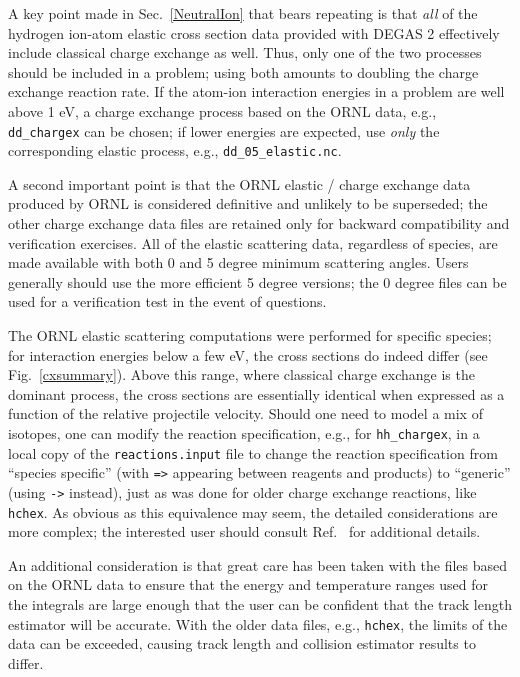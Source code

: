 \documentclass[12pt]{report}
\begin{document}
A key point made in Sec.~\ref{NeutralIon} that bears repeating is that
{\em all} of the hydrogen ion-atom elastic cross section data provided with DEGAS 2
effectively include classical charge exchange as well.  Thus, only one
of the two processes should be included in a problem; using both 
amounts to doubling the charge exchange reaction rate.  If the 
atom-ion interaction energies in a problem are 
well above 1 eV, a charge exchange process
based on the ORNL data, e.g., {\tt dd\_chargex}
can be chosen; if lower energies are expected, use {\em only}
the corresponding elastic process, e.g., {\tt dd\_05\_elastic.nc}.

A second important point is that the ORNL elastic / charge exchange
data produced by ORNL\cite{Krst98} is considered definitive
and unlikely to be superseded; the other charge exchange data
files are retained only for backward compatibility and verification
exercises.  All of the elastic scattering data, regardless of species,
are made available with both 0 and 5 degree minimum scattering angles.
Users generally should use the more efficient 5 degree versions; the
0 degree files can be used for a verification test in the event
of questions.

The ORNL elastic scattering computations were performed for
specific species; for interaction energies below a few eV, the cross 
sections do indeed differ (see Fig.~\ref{cxsummary}).  Above this
range, where classical charge exchange is the dominant process,
the cross sections are essentially identical when expressed
as a function of the relative projectile velocity.  Should one
need to model a mix of isotopes, one can modify the reaction 
specification, e.g., for {\tt hh\_chargex}, in a local copy 
of the {\tt reactions.input} file to change the reaction
specification from ``species specific'' (with \verb+=>+ 
appearing between reagents and products) to ``generic''
(using \verb+->+ instead), just as was done for older 
charge exchange reactions, like {\tt hchex}.  As obvious
as this equivalence may seem, the detailed considerations
are more complex; the interested user should consult
Ref.~\cite{Krst99} for additional details.

An additional consideration is that great care has been taken with
the files based on the ORNL data to ensure that the energy and
temperature ranges used for the integrals are large enough that
the user can be confident that the track length estimator 
will be accurate.  With the older data files, e.g., {\tt hchex}, 
the limits of the data can be exceeded, causing track length
and collision estimator results to differ.
\end{document}
